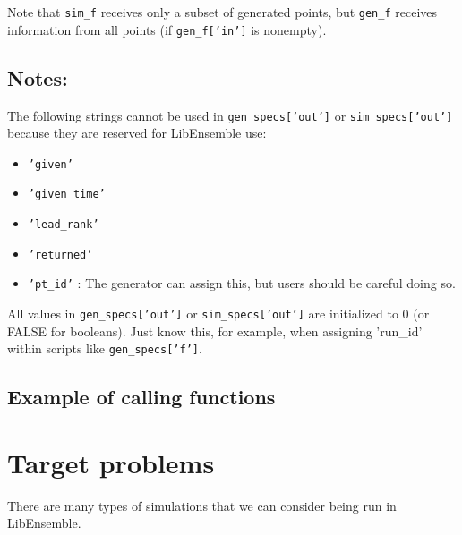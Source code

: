 \documentclass{article}
\begin{document}
Note that \texttt{sim\_f} receives only a subset of generated points, but
\texttt{gen\_f} receives information from all points (if \texttt{gen\_f['in']}
is nonempty).

\subsection{Notes:}
The following strings cannot be used in  \texttt{gen\_specs['out']} or
\texttt{sim\_specs['out']} because they are reserved for LibEnsemble use:
\begin{itemize}
  \item \texttt{'given'}
  \item \texttt{'given\_time'}
  \item \texttt{'lead\_rank'}
  \item \texttt{'returned'}
  \item \texttt{'pt\_id'} : The generator can assign this, but users should be
    careful doing so.
\end{itemize}

All values in \texttt{gen\_specs['out']} or \texttt{sim\_specs['out']} are
initialized to 0 (or FALSE for booleans). Just know this, for example, when
assigning 'run\_id' within scripts like \texttt{gen\_specs['f']}.


\clearpage
\subsection{Example of calling functions}


\clearpage


\clearpage
\section{Target problems}
There are many types of simulations that we can consider being run in LibEnsemble.
\end{document}
